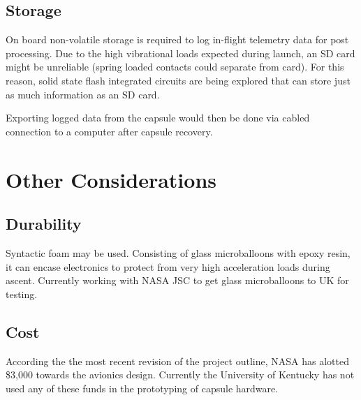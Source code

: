 \documentclass{article}
\begin{document}
\subsection{Storage}
On board non-volatile storage is required to log in-flight telemetry data for post processing. Due to the high vibrational loads expected during launch, an SD card might be unreliable (spring loaded contacts could separate from card). For this reason, solid state flash integrated circuits are being explored that can store just as much information as an SD card. 

Exporting logged data from the capsule would then be done via cabled connection to a computer after capsule recovery.


\section{Other Considerations}

\subsection{Durability}
Syntactic foam may be used. Consisting of glass microballoons with epoxy resin, it can encase electronics to protect from very high acceleration loads during ascent. Currently working with NASA JSC to get glass microballoons to UK for testing.


\subsection{Cost}
According the the most recent revision of the project outline, NASA has alotted \$3,000 towards the avionics design. Currently the University of Kentucky has not used any of these funds in the prototyping of capsule hardware.








\appendix
\end{document}
